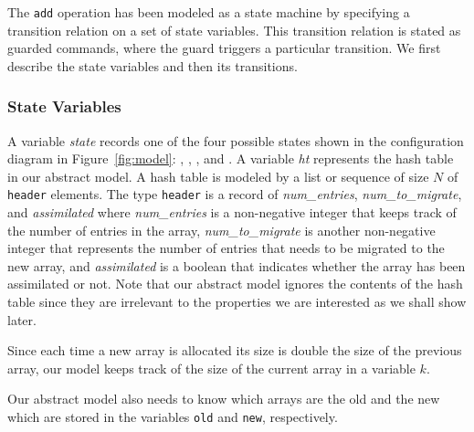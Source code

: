 The \texttt{add} operation has been modeled as a state machine by
specifying a transition relation on a set of state variables. This
transition relation is stated as guarded commands, where the guard
triggers a particular transition. We first describe the state
variables and then its transitions.

\subsubsection{State Variables}

A variable \emph{state} records one of the four possible states shown
in the configuration diagram in Figure~\ref{fig:model}:
\emph{\pczero}, \emph{\pcone}, \emph{\pctwo}, and \emph{\pcthree}.
%
A variable \emph{ht} represents the hash table in our abstract model.
A hash table is modeled by a list or sequence of size $N$ of
\texttt{header} elements. The type \texttt{header} is a record of
\emph{num\_entries}, \emph{num\_to\_migrate}, and \emph{assimilated}
where \emph{num\_entries} is a non-negative integer that keeps track
of the number of entries in the array, \emph{num\_to\_migrate} is
another non-negative integer that represents the number of entries
that needs to be migrated to the new array, and \emph{assimilated} is
a boolean that indicates whether the array has been assimilated or
not. Note that our abstract model ignores the contents of the hash
table since they are irrelevant to the properties we are interested as
we shall show later. 



Since each time a new array is allocated its size is double the size
of the previous array, our model keeps track of the size of the
current array in a variable $k$.

Our abstract model also needs to know which arrays are the old and the
new which are stored in the variables \texttt{old} and \texttt{new},
respectively.




